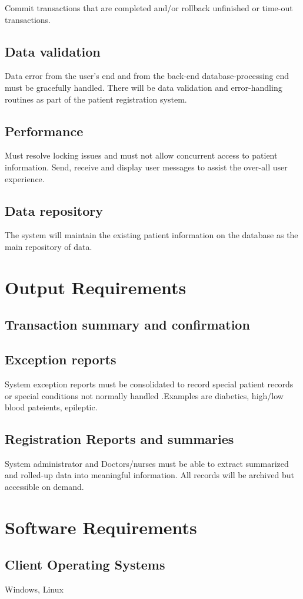 \documentclass[a4paper]{article}
\begin{document}
Commit transactions that are completed and/or rollback unfinished or time-out transactions.

\subsection{Data validation}

Data error from the user’s end and from the back-end database-processing end must be gracefully handled. There will be data validation and error-handling routines as part of the patient registration system.

\subsection{Performance}

Must resolve locking issues and must not allow concurrent access to patient information. Send, receive and display user messages to assist the over-all user experience.

\subsection{Data repository}

The  system will maintain the existing patient information on the database as the main repository of data.

\section{Output Requirements}

\subsection{Transaction summary and confirmation}

\subsection{Exception reports}

System exception reports must be consolidated to record special patient records or special conditions not normally handled .Examples are diabetics, high/low blood pateients, epileptic.

\subsection{Registration Reports and summaries}

System administrator and Doctors/nurses must be able to extract summarized and rolled-up data into meaningful information. All records will be archived but accessible on demand.

\section{Software Requirements}

\subsection{Client Operating Systems}

Windows, Linux
	
\end{document}
